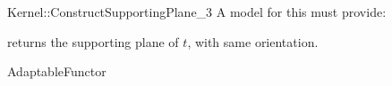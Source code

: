 \begin{ccRefFunctionObjectConcept}{Kernel::ConstructSupportingPlane_3}
A model for this must provide:


       {returns the supporting plane of $t$, with same orientation.}

\ccRefines
AdaptableFunctor

\ccSeeAlso
{} \\

\end{ccRefFunctionObjectConcept}
